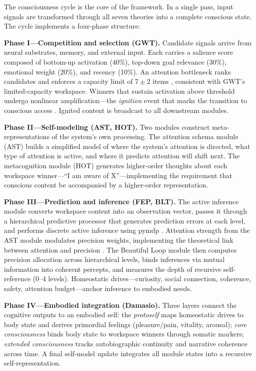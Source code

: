 The consciousness cycle is the core of the framework. In a single pass, input signals are transformed through all seven theories into a complete conscious state. The cycle implements a four-phase structure:

\textbf{Phase I---Competition and selection (GWT).} Candidate signals arrive from neural substrates, memory, and external input. Each carries a salience score composed of bottom-up activation (40\%), top-down goal relevance (30\%), emotional weight (20\%), and recency (10\%). An attention bottleneck ranks candidates and enforces a capacity limit of $7 \pm 2$ items \cite{miller1956}, consistent with GWT's limited-capacity workspace. Winners that sustain activation above threshold undergo nonlinear amplification---the \textit{ignition} event that marks the transition to conscious access \cite{dehaene2001}. Ignited content is broadcast to all downstream modules.

\textbf{Phase II---Self-modeling (AST, HOT).} Two modules construct meta-representations of the system's own processing. The attention schema module (AST) builds a simplified model of where the system's attention is directed, what type of attention is active, and where it predicts attention will shift next. The metacognition module (HOT) generates higher-order thoughts about each workspace winner---``I am aware of X''---implementing the requirement that conscious content be accompanied by a higher-order representation.

\textbf{Phase III---Prediction and inference (FEP, BLT).} The active inference module converts workspace content into an observation vector, passes it through a hierarchical predictive processor that generates prediction errors at each level, and performs discrete active inference using pymdp \cite{heins2022}. Attention strength from the AST module modulates precision weights, implementing the theoretical link between attention and precision \cite{feldman2010}. The Beautiful Loop module then computes precision allocation across hierarchical levels, binds inferences via mutual information into coherent percepts, and measures the depth of recursive self-reference (0--4 levels). Homeostatic drives---curiosity, social connection, coherence, safety, attention budget---anchor inference to embodied needs.

\textbf{Phase IV---Embodied integration (Damasio).} Three layers connect the cognitive outputs to an embodied self: the \textit{protoself} maps homeostatic drives to body state and derives primordial feelings (pleasure/pain, vitality, arousal); \textit{core consciousness} binds body state to workspace winners through somatic markers; \textit{extended consciousness} tracks autobiographic continuity and narrative coherence across time. A final self-model update integrates all module states into a recursive self-representation.

